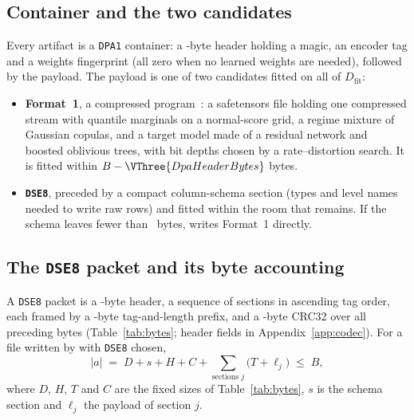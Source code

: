 \subsection{Container and the two candidates}\label{sec:container}
Every  artifact is a \texttt{DPA1} container: a -byte header holding a magic, an encoder tag and a weights fingerprint (all zero when no learned weights are needed), followed by the payload.
The payload is one of two candidates fitted on all of $D_{\mathrm{fit}}$:
\begin{itemize}
  \item \textbf{Format~1}, a compressed program~\citep{dope2026v1}: a safetensors file holding one compressed stream with quantile marginals on a normal-score grid, a regime mixture of Gaussian copulas, and a target model made of a residual network and boosted oblivious trees, with bit depths chosen by a rate--distortion search. It is fitted within $B-\VThree{DpaHeaderBytes}$ bytes.
  \item \textbf{\texttt{DSE8}}, preceded by a compact column-schema section (types and level names needed to write raw rows) and fitted within the room that remains. If the schema leaves fewer than ~bytes,  writes Format~1 directly.
\end{itemize}

\subsection{The \texttt{DSE8} packet and its byte accounting}\label{sec:codec}
A \texttt{DSE8} packet is a -byte header, a sequence of sections in ascending tag order, each framed by a -byte tag-and-length prefix, and a -byte CRC32 over all preceding bytes (Table~\ref{tab:bytes}; header fields in Appendix~\ref{app:codec}).
For a file written by  with \texttt{DSE8} chosen,
\begin{equation}\label{eq:bytes}
  |a| \;=\; D + s + H + C + \sum_{\text{sections } j} \bigl(T + \ell_j\bigr) \;\le\; B ,
\end{equation}
where $D$, $H$, $T$ and $C$ are the fixed sizes of Table~\ref{tab:bytes}, $s$ is the schema section and $\ell_j$ the payload of section $j$.

